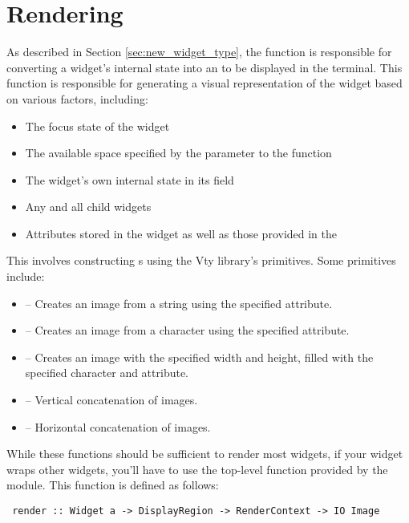 \section{Rendering}

As described in Section \ref{sec:new_widget_type}, the 
function is responsible for converting a widget's internal state into
an  to be displayed in the terminal.  This function is
responsible for generating a visual representation of the widget based
on various factors, including:

\begin{itemize}
\item The focus state of the widget
\item The available space specified by the  parameter to the
   function
\item The widget's own internal state in its  field
\item Any and all child widgets
\item Attributes stored in the widget as well as those provided in the
\end{itemize}

This involves constructing s using the Vty library's
primitives.  Some primitives include:

\begin{itemize}
\item {} -- Creates an image from a string using the
  specified attribute.
\item {} -- Creates an image from a character using the
  specified attribute.
\item {} -- Creates an image with the specified width and
  height, filled with the specified character and attribute.
\item \fw{<->} -- Vertical concatenation of images.
\item \fw{<|>} -- Horizontal concatenation of images.
\end{itemize}

While these functions should be sufficient to render most widgets, if
your widget wraps other widgets, you'll have to use the top-level
 function provided by the  module.  This function
is defined as follows:

\begin{verbatim}
 render :: Widget a -> DisplayRegion -> RenderContext -> IO Image
\end{verbatim}

